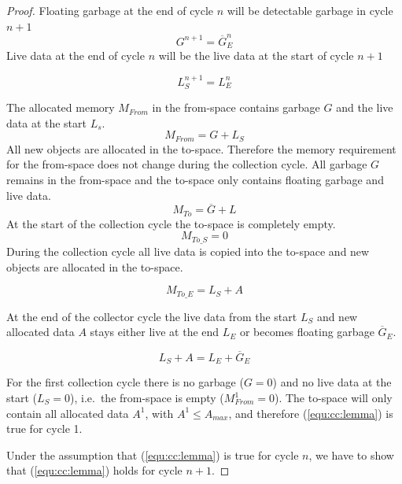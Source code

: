\begin{proof}

Floating garbage at the end of cycle $n$ will be detectable garbage
in cycle $n+1$
%
\begin{equation}\label{equ:cc:flg}
    G^{n+1} = \overline{G}_E^n
\end{equation}
%
Live data at the end of cycle $n$ will be the live data at the start
of cycle $n+1$

\begin{equation}\label{equ:cc:ldata}
    L_S^{n+1} = L_E^{n}
\end{equation}


The allocated memory $M_{From}$ in the from-space contains garbage
$G$ and the live data at the start $L_s$.
%
\begin{equation}
    M_{From} = G + L_S
\end{equation}
%
All new objects are allocated in the to-space. Therefore the memory
requirement for the from-space does not change during the collection
cycle. All garbage $G$ remains in the from-space and the to-space
only contains floating garbage and live data.
%
\begin{equation}
    M_{To} = \overline{G} + L
\end{equation}
%
At the start of the collection cycle the to-space is completely
empty.
%
\begin{equation}
    M_{To\_S} = 0
\end{equation}
%
During the collection cycle all live data is copied into the
to-space and new objects are allocated in the to-space.

\begin{equation}
    M_{To\_E} = L_S + A
\end{equation}

At the end of the collector cycle the live data from the start $L_S$
and new allocated data $A$ stays either live at the end $L_E$ or
becomes floating garbage $\overline{G}_E$.

\begin{equation}
    L_S + A = L_E + \overline{G}_E
\end{equation}

For the first collection cycle there is no garbage ($G=0$) and no
live data at the start ($L_S=0$), i.e.\ the from-space is empty
($M_{From}^1=0$). The to-space will only contain all allocated data
$A^1$, with $A^1 \le A_{max}$, and therefore (\ref{equ:cc:lemma}) is
true for cycle 1.

Under the assumption that (\ref{equ:cc:lemma}) is true for cycle
$n$, we have to show that (\ref{equ:cc:lemma}) holds for cycle
$n+1$.


\end{proof}
